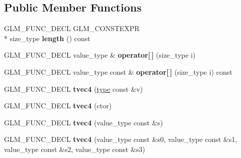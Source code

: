 \subsection*{Public Member Functions}
\begin{DoxyCompactItemize}
\item 
\hypertarget{structglm_1_1detail_1_1tvec4_abf7879a66d8c8e3bb413216055568c5a}{G\-L\-M\-\_\-\-F\-U\-N\-C\-\_\-\-D\-E\-C\-L G\-L\-M\-\_\-\-C\-O\-N\-S\-T\-E\-X\-P\-R \\*
size\-\_\-type {\bfseries length} () const }\label{structglm_1_1detail_1_1tvec4_abf7879a66d8c8e3bb413216055568c5a}

\item 
\hypertarget{structglm_1_1detail_1_1tvec4_a36ddbd2ee45cd2eba80e479c349c4c21}{G\-L\-M\-\_\-\-F\-U\-N\-C\-\_\-\-D\-E\-C\-L value\-\_\-type \& {\bfseries operator\mbox{[}$\,$\mbox{]}} (size\-\_\-type i)}\label{structglm_1_1detail_1_1tvec4_a36ddbd2ee45cd2eba80e479c349c4c21}

\item 
\hypertarget{structglm_1_1detail_1_1tvec4_a3dbc4e601a499b4317f9fdbd98c6316e}{G\-L\-M\-\_\-\-F\-U\-N\-C\-\_\-\-D\-E\-C\-L value\-\_\-type const \& {\bfseries operator\mbox{[}$\,$\mbox{]}} (size\-\_\-type i) const }\label{structglm_1_1detail_1_1tvec4_a3dbc4e601a499b4317f9fdbd98c6316e}

\item 
\hypertarget{structglm_1_1detail_1_1tvec4_a4bdded9554fe40d756d1053f34d0630f}{G\-L\-M\-\_\-\-F\-U\-N\-C\-\_\-\-D\-E\-C\-L {\bfseries tvec4} (\hyperlink{structglm_1_1detail_1_1tvec4}{type} const \&v)}\label{structglm_1_1detail_1_1tvec4_a4bdded9554fe40d756d1053f34d0630f}

\item 
\hypertarget{structglm_1_1detail_1_1tvec4_a41263083d8c13d7a5ac082662e362e39}{G\-L\-M\-\_\-\-F\-U\-N\-C\-\_\-\-D\-E\-C\-L {\bfseries tvec4} (ctor)}\label{structglm_1_1detail_1_1tvec4_a41263083d8c13d7a5ac082662e362e39}

\item 
\hypertarget{structglm_1_1detail_1_1tvec4_a3b0f7edb1ddfd5cbf098d66b2ffe3607}{G\-L\-M\-\_\-\-F\-U\-N\-C\-\_\-\-D\-E\-C\-L {\bfseries tvec4} (value\-\_\-type const \&s)}\label{structglm_1_1detail_1_1tvec4_a3b0f7edb1ddfd5cbf098d66b2ffe3607}

\item 
\hypertarget{structglm_1_1detail_1_1tvec4_ad982f73c86d64540e263102067828e0e}{G\-L\-M\-\_\-\-F\-U\-N\-C\-\_\-\-D\-E\-C\-L {\bfseries tvec4} (value\-\_\-type const \&s0, value\-\_\-type const \&s1, value\-\_\-type const \&s2, value\-\_\-type const \&s3)}\label{structglm_1_1detail_1_1tvec4_ad982f73c86d64540e263102067828e0e}


\end{DoxyCompactItemize}
